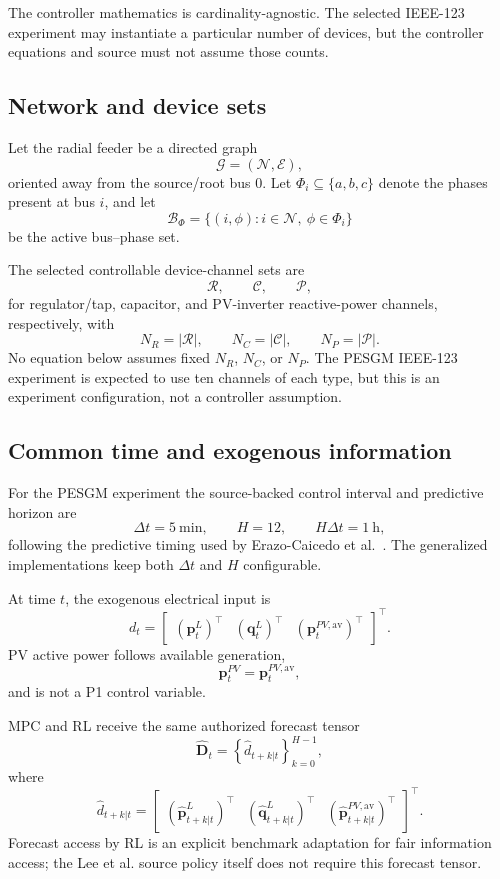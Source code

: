 The controller mathematics is cardinality-agnostic.  The selected IEEE-123 experiment
may instantiate a particular number of devices, but the controller equations and source
must not assume those counts.

\subsection{Network and device sets}
\label{subsec:p1_sets}

Let the radial feeder be a directed graph
\[
\mathcal G=(\mathcal N,\mathcal E),
\]
oriented away from the source/root bus $0$.  Let $\Phi_i\subseteq\{a,b,c\}$ denote the
phases present at bus $i$, and let
\[
\mathcal B_{\Phi}
=
\{(i,\phi):i\in\mathcal N,\ \phi\in\Phi_i\}
\]
be the active bus--phase set.

The selected controllable device-channel sets are
\[
\mathcal R,\qquad
\mathcal C,\qquad
\mathcal P,
\]
for regulator/tap, capacitor, and PV-inverter reactive-power channels, respectively, with
\[
N_R=|\mathcal R|,\qquad
N_C=|\mathcal C|,\qquad
N_P=|\mathcal P|.
\]
No equation below assumes fixed $N_R$, $N_C$, or $N_P$.  The PESGM IEEE-123 experiment
is expected to use ten channels of each type, but this is an experiment configuration,
not a controller assumption.

\subsection{Common time and exogenous information}
\label{subsec:p1_time_info}

For the PESGM experiment the source-backed control interval and predictive horizon are
\[
\Delta t = 5~\mathrm{min},
\qquad
H=12,
\qquad
H\Delta t = 1~\mathrm{h},
\]
following the predictive timing used by Erazo-Caicedo et al.~\cite{erazo2022model}.
The generalized implementations keep both $\Delta t$ and $H$ configurable.

At time $t$, the exogenous electrical input is
\[
d_t
=
\begin{bmatrix}
(\mathbf p_t^L)^\top &
(\mathbf q_t^L)^\top &
(\mathbf p_t^{PV,\mathrm{av}})^\top
\end{bmatrix}^{\top}.
\]
PV active power follows available generation,
\[
\mathbf p_t^{PV}
=
\mathbf p_t^{PV,\mathrm{av}},
\]
and is not a P1 control variable.

MPC and RL receive the same authorized forecast tensor
\[
\widehat{\mathbf D}_t
=
\left\{
\hat d_{t+k|t}
\right\}_{k=0}^{H-1},
\]
where
\[
\hat d_{t+k|t}
=
\begin{bmatrix}
(\hat{\mathbf p}_{t+k|t}^{L})^\top &
(\hat{\mathbf q}_{t+k|t}^{L})^\top &
(\hat{\mathbf p}_{t+k|t}^{PV,\mathrm{av}})^\top
\end{bmatrix}^{\top}.
\]
Forecast access by RL is an explicit benchmark adaptation for fair information access; the
Lee et al. source policy itself does not require this forecast tensor.

